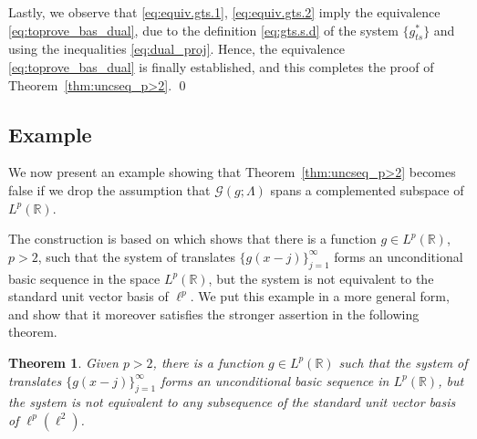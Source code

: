 \documentclass[reqno,a4paper,12pt]{amsart}
\numberwithin{equation}{section}
\numberwithin{figure}{section}
\newcommand\R{\mathbb{R}}
\newcommand\G{\mathcal{G}}
\newcommand\1{\mathds{1}}
\theoremstyle{plain}
\newtheorem{thm}{Theorem}[section]
\newcommand{\thmref}[1]{Theorem~\ref{#1}}
\theoremstyle{definition}
\begin{document}
Lastly, we observe that \eqref{eq:equiv.gts.1}, \eqref{eq:equiv.gts.2}
imply the equivalence \eqref{eq:toprove_bas_dual},
due to  the definition \eqref{eq:gts.s.d} of the system $\{ g_{ts}^* \}$
and using the inequalities  \eqref{eq:dual_proj}.
Hence, the equivalence \eqref{eq:toprove_bas_dual} is finally
established, and this completes the proof of \thmref{thm:uncseq_p>2}.
\qed





\subsection{Example}
We now present an example showing that \thmref{thm:uncseq_p>2} becomes false if we drop the assumption that $\G(g; \Lambda)$
spans a complemented subspace of $L^p(\R)$.

The construction is based on \cite[Example 2.16]{OSSZ11} which shows that there is a function $g \in L^p(\R)$, $p>2$, such that the system of translates $\{g(x-j)\}_{j=1}^{\infty}$ forms an unconditional basic sequence in  the space $L^p(\R)$, but the system is not equivalent to the standard unit vector basis of $\ell^p$. We put this example in a more general form, and show that it moreover satisfies the  stronger assertion in the following theorem.


\begin{thm}
\label{thm:n.c.s}
Given $p>2$, there is a function $g \in L^p(\R)$ such that the system of translates $\{g(x-j)\}_{j=1}^{\infty}$ forms an unconditional basic sequence in $L^p(\R)$, but the system is not equivalent to any sub\-sequence of the standard unit vector basis of $\ell^p(\ell^2)$.
\end{thm}
\end{document}
